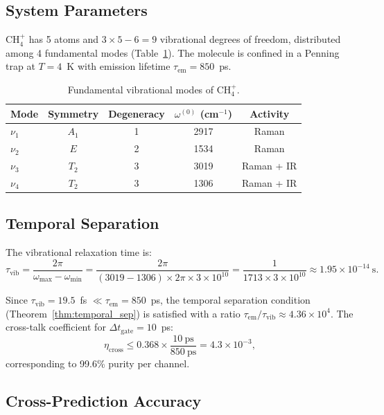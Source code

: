 \documentclass[11pt,twocolumn,a4paper]{article}
\theoremstyle{definition}
\theoremstyle{remark}
\begin{document}
\subsection{System Parameters}

CH$_4^+$ has 5 atoms and $3 \times 5 - 6 = 9$ vibrational degrees of freedom, distributed among 4 fundamental modes (Table~\ref{tab:ch4_modes}). The molecule is confined in a Penning trap at $T = 4$~K with emission lifetime $\tau_{\mathrm{em}} = 850$~ps.

\begin{table}[ht]
\centering
\caption{Fundamental vibrational modes of CH$_4^+$.}
\label{tab:ch4_modes}
\begin{tabular}{lcccc}
\toprule
Mode & Symmetry & Degeneracy & $\omega^{(0)}$ (cm$^{-1}$) & Activity \\
\midrule
$\nu_1$ & $A_1$ & 1 & 2917 & Raman \\
$\nu_2$ & $E$   & 2 & 1534 & Raman \\
$\nu_3$ & $T_2$ & 3 & 3019 & Raman + IR \\
$\nu_4$ & $T_2$ & 3 & 1306 & Raman + IR \\
\bottomrule
\end{tabular}
\end{table}

\subsection{Temporal Separation}

The vibrational relaxation time is:
\begin{equation}
\tau_{\mathrm{vib}} = \frac{2\pi}{\omega_{\max} - \omega_{\min}} = \frac{2\pi}{(3019 - 1306) \times 2\pi \times 3 \times 10^{10}} = \frac{1}{1713 \times 3 \times 10^{10}} \approx 1.95 \times 10^{-14}~\mathrm{s}.
\end{equation}

Since $\tau_{\mathrm{vib}} = 19.5$~fs $\ll \tau_{\mathrm{em}} = 850$~ps, the temporal separation condition (Theorem~\ref{thm:temporal_sep}) is satisfied with a ratio $\tau_{\mathrm{em}}/\tau_{\mathrm{vib}} \approx 4.36 \times 10^4$. The cross-talk coefficient for $\Delta t_{\mathrm{gate}} = 10$~ps:
\begin{equation}
\eta_{\mathrm{cross}} \leq 0.368 \times \frac{10~\mathrm{ps}}{850~\mathrm{ps}} = 4.3 \times 10^{-3},
\end{equation}
corresponding to 99.6\% purity per channel.

\subsection{Cross-Prediction Accuracy}
\end{document}
